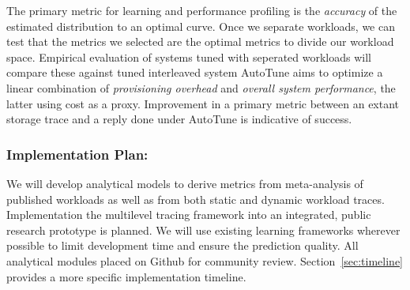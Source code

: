 The primary metric for learning and performance profiling is the
\emph{accuracy} of the estimated distribution to an optimal curve.
Once
we separate workloads, we can test that the metrics we selected are the optimal
metrics to divide our workload space.
Empirical evaluation of systems tuned with seperated workloads will compare
these against tuned interleaved system%
AutoTune aims to optimize a linear combination of \emph{provisioning overhead} and \emph{overall system performance}, the latter using cost as a proxy.
Improvement in a primary metric between an extant storage trace and a reply done
under AutoTune is indicative of success.
\subsubsection*{Implementation Plan: } 
We will develop analytical models to derive metrics from meta-analysis of
published workloads as well as from both static and dynamic workload traces.
Implementation the multilevel tracing framework into an integrated, public research prototype is planned.  
We will use existing learning frameworks wherever possible to limit development
time and ensure the prediction quality.  All
analytical modules placed on Github for community
review.
Section~\ref{sec:timeline} provides a more specific implementation timeline. %


